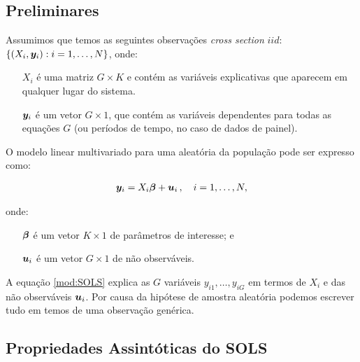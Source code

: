 \documentclass[11pt, oneside, a4paper, article]{article}
\numberwithin{equation}{section}
\begin{document}
\citet[Sec.7.3 -- System OLS Estimation of a Multivariate Linear System, p.147]{wool-2010} 

\subsection{Preliminares}
\noindent
\citet[Sec.7.3.1]{wool-2010}

Assumimos que temos as seguintes observações \textit{cross section} $iid$:
$\{ (X_{i}, \boldsymbol{y}_{i}): i=1, \dots, N\}$, onde:

\vspace{-1 ex}
\begin{itemize}[itemsep = -1ex]
\item [$X_{i}$]  é uma matriz $G \times K$ e contém as variáveis explicativas que aparecem em qualquer lugar do sistema.
\item [$\boldsymbol{y}_{i}$]  é um vetor $G \times 1$, que contém as variáveis dependentes para todas as equações $G$ (ou períodos de tempo, no caso de dados de painel).
\end{itemize}

O modelo linear multivariado para uma  aleatória da população pode ser expresso como:

\vspace{-1 em}
\begin{align}\label{mod:SOLS}
	\boldsymbol{y}_{i} = X_{i} \boldsymbol{\beta} + \boldsymbol{u}_{i} \, , \quad i=1, \dots, N,
\end{align}

\noindent
onde:

\vspace{-1 em}
\begin{itemize}[itemsep = -1ex]
\item [$\boldsymbol{\beta}$] é um vetor $K \times 1$ de parâmetros de interesse; e
\item [$\boldsymbol{u}_{i}$] é um vetor $G \times 1$ de não observáveis.
\end{itemize}

A equação \eqref{mod:SOLS} explica as $G$ variáveis $y_{i1}, \dots, y_{iG}$ em termos de $X_{i}$ e das não observáveis $\boldsymbol{u}_{i}$.
Por causa da hipótese de amostra aleatória podemos escrever tudo em temos de uma observação genérica.

\subsection{Propriedades Assintóticas do SOLS}
\noindent
\citet[Sec.7.3.1]{wool-2010}
\end{document}
